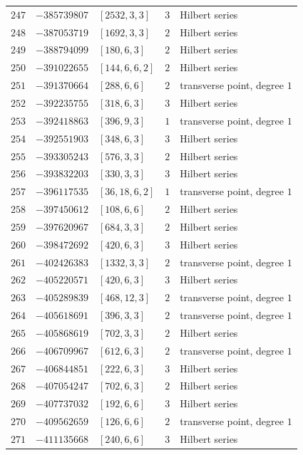 \documentclass[11pt]{article}
\begin{document}
\begin{center}
\begin{longtable}{r r l c l}
$247$ & $-385739807$ & $[2532,3,3]$ & $3$ & Hilbert series\\
$248$ & $-387053719$ & $[1692,3,3]$ & $2$ & Hilbert series\\
$249$ & $-388794099$ & $[180,6,3]$ & $2$ & Hilbert series\\
$250$ & $-391022655$ & $[144,6,6,2]$ & $2$ & Hilbert series\\
$251$ & $-391370664$ & $[288,6,6]$ & $2$ & transverse point, degree $1$\\
$252$ & $-392235755$ & $[318,6,3]$ & $3$ & Hilbert series\\
$253$ & $-392418863$ & $[396,9,3]$ & $1$ & transverse point, degree $1$\\
$254$ & $-392551903$ & $[348,6,3]$ & $3$ & Hilbert series\\
$255$ & $-393305243$ & $[576,3,3]$ & $2$ & Hilbert series\\
$256$ & $-393832203$ & $[330,3,3]$ & $3$ & Hilbert series\\
$257$ & $-396117535$ & $[36,18,6,2]$ & $1$ & transverse point, degree $1$\\
$258$ & $-397450612$ & $[108,6,6]$ & $2$ & Hilbert series\\
$259$ & $-397620967$ & $[684,3,3]$ & $2$ & Hilbert series\\
$260$ & $-398472692$ & $[420,6,3]$ & $3$ & Hilbert series\\
$261$ & $-402426383$ & $[1332,3,3]$ & $2$ & transverse point, degree $1$\\
$262$ & $-405220571$ & $[420,6,3]$ & $3$ & Hilbert series\\
$263$ & $-405289839$ & $[468,12,3]$ & $2$ & transverse point, degree $1$\\
$264$ & $-405618691$ & $[396,3,3]$ & $2$ & transverse point, degree $1$\\
$265$ & $-405868619$ & $[702,3,3]$ & $2$ & Hilbert series\\
$266$ & $-406709967$ & $[612,6,3]$ & $2$ & transverse point, degree $1$\\
$267$ & $-406844851$ & $[222,6,3]$ & $3$ & Hilbert series\\
$268$ & $-407054247$ & $[702,6,3]$ & $2$ & Hilbert series\\
$269$ & $-407737032$ & $[192,6,6]$ & $3$ & Hilbert series\\
$270$ & $-409562659$ & $[126,6,6]$ & $2$ & transverse point, degree $1$\\
$271$ & $-411135668$ & $[240,6,6]$ & $3$ & Hilbert series\\

\end{longtable}
\end{center}
\end{document}
